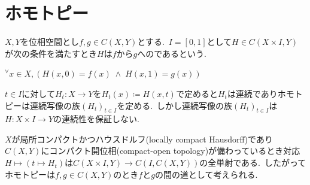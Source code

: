 
\section{ホモトピー}

\begin{definition}
$X, Y$を位相空間とし$f, g \in C(X, Y)$とする.\
$I = [0,1]$として$H \in C(X \times I, Y)$が次の条件を満たすとき$H$は$f$から$g$へのであるという.
\begin{center}
    $^{\forall}x \in X, (H(x, 0) = f(x) \; \land \; H(x, 1) = g(x))$
\end{center}
\end{definition}

\begin{remark}
$t \in I$に対して$H_t : X \to Y$を$H_t(x) \coloneq H(x, t)$で定めると$H_t$は連続でありホモトピーは連続写像の族$(H_t)_{t \in I}$を定める.\
しかし連続写像の族$(H_t)_{t \in I}$は$H : X \times I \to Y$の連続性を保証しない.

$X$が局所コンパクトかつハウスドルフ(locally compact Hausdorff)であり$C(X, Y)$にコンパクト開位相(compact-open topology)が備わっているとき対応$H \mapsto (t \mapsto H_t)$は$C(X \times I, Y) \to C(I, C(X, Y))$の全単射である.\
したがってホモトピーは$f, g \in C(X, Y)$のとき$f$と$g$の間の道として考えられる.
\end{remark}